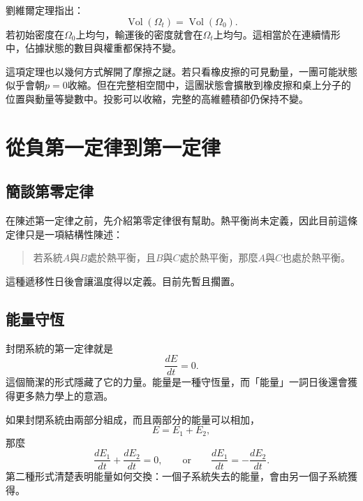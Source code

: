 劉維爾定理指出：
\begin{equation}
 \operatorname{Vol}(\Omega_t)
 =
 \operatorname{Vol}(\Omega_0).
 \label{eq:sm1-liouville-volume}
\end{equation}
若初始密度在\(\Omega_0\)上均勻，輸運後的密度就會在\(\Omega_t\)上均勻。這相當於在連續情形中，佔據狀態的數目與權重都保持不變。

這項定理也以幾何方式解開了摩擦之謎。若只看橡皮擦的可見動量，一團可能狀態似乎會朝\(p=0\)收縮。但在完整相空間中，這團狀態會擴散到橡皮擦和桌上分子的位置與動量等變數中。投影可以收縮，完整的高維體積卻仍保持不變。

\begin{classroomqa}
\end{classroomqa}

\section{從負第一定律到第一定律}

\subsection{簡談第零定律}

在陳述第一定律之前，先介紹第零定律很有幫助。熱平衡尚未定義，因此目前這條定律只是一項結構性陳述：
\begin{quote}
若系統\(A\)與\(B\)處於熱平衡，且\(B\)與\(C\)處於熱平衡，那麼\(A\)與\(C\)也處於熱平衡。
\end{quote}
這種遞移性日後會讓溫度得以定義。目前先暫且擱置。

\subsection{能量守恆}

封閉系統的第一定律就是
\begin{equation}
 \frac{dE}{dt}=0.
 \label{eq:sm1-first-law}
\end{equation}
這個簡潔的形式隱藏了它的力量。能量是一種守恆量，而「能量」一詞日後還會獲得更多熱力學上的意涵。

如果封閉系統由兩部分組成，而且兩部分的能量可以相加，
\begin{equation}
 E=E_1+E_2,
\end{equation}
那麼
\begin{equation}
 \frac{dE_1}{dt}+\frac{dE_2}{dt}=0,
 \qquad\text{or}\qquad
 \frac{dE_1}{dt}=-\frac{dE_2}{dt}.
 \label{eq:sm1-energy-exchange}
\end{equation}
第二種形式清楚表明能量如何交換：一個子系統失去的能量，會由另一個子系統獲得。

